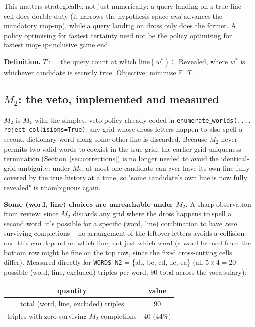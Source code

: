 \documentclass[11pt]{article}
\begin{document}
This matters strategically, not just numerically: a query landing on a
true-line cell does double duty (it narrows the hypothesis space \emph{and}
advances the mandatory mop-up), while a query landing on dross only does
the former. A policy optimising for fastest certainty need not be the
policy optimising for fastest mop-up-inclusive game end.

\textbf{Definition.} $T := $ the query count at which $\mathrm{line}(w^*)
\subseteq \mathrm{Revealed}$, where $w^*$ is whichever candidate is
secretly true. Objective: minimise $\mathbb{E}[T]$.

\subsection{$M_2$: the veto, implemented and measured}

$M_2$ is $M_1$ with the simplest veto policy already coded in
\texttt{enumerate\_worlds(..., reject\_collisions=True)}: any grid whose
dross letters happen to also spell a second dictionary word along some
other line is discarded. Because $M_2$ never permits two valid words to
coexist in the true grid, the earlier grid-uniqueness termination
(Section~\ref{sec:corrections}) is no longer needed to avoid the
identical-grid ambiguity: under $M_2$, at most one candidate can ever have
its own line fully covered by the true history at a time, so "some
candidate's own line is now fully revealed" is unambiguous again.

\textbf{Some (word, line) choices are unreachable under $M_2$.} A sharp
observation from review: since $M_2$ discards any grid where the dross
happens to spell a second word, it's possible for a specific (word, line)
combination to have \emph{zero} surviving completions -- no arrangement of
the leftover letters avoids a collision -- and this can depend on which
line, not just which word (a word banned from the bottom row might be
fine on the top row, since the fixed cross-cutting cells differ). Measured
directly for \texttt{WORDS\_N2} = \{ab, bc, cd, de, ea\} (all $5\times4=20$
possible (word, line, excluded) triples per word, $90$ total across the
vocabulary):

\begin{center}
\begin{tabular}{cc}
\toprule
quantity & value \\
\midrule
total (word, line, excluded) triples & 90 \\
triples with zero surviving $M_2$ completions & 40 (44\%) \\
\bottomrule
\end{tabular}
\end{center}
\end{document}
